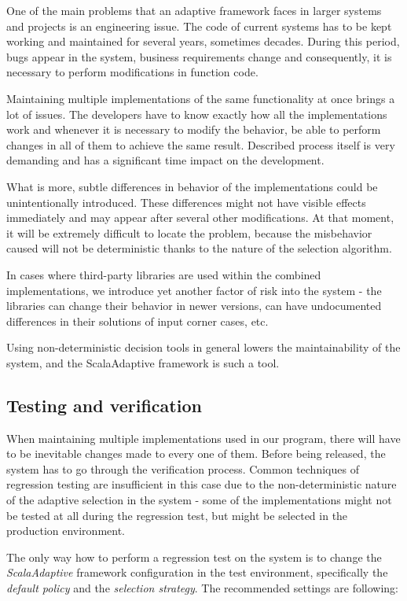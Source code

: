 One of the main problems that an adaptive framework faces in larger systems and projects is an engineering issue. The code of current systems has to be kept working and maintained for several years, sometimes decades. During this period, bugs appear in the system, business requirements change and consequently, it is necessary to perform modifications in function code.

Maintaining multiple implementations of the same functionality at once brings a lot of issues. The developers have to know exactly how all the implementations work and whenever it is necessary to modify the behavior, be able to perform changes in all of them to achieve the same result. Described process itself is very demanding and has a significant time impact on the development. 

What is more, subtle differences in behavior of the implementations could be unintentionally introduced. These differences might not have visible effects immediately and may appear after several other modifications. At that moment, it will be extremely difficult to locate the problem, because the misbehavior caused will not be deterministic thanks to the nature of the selection algorithm.

In cases where third-party libraries are used within the combined implementations, we introduce yet another factor of risk into the system - the libraries can change their behavior in newer versions, can have undocumented differences in their solutions of input corner cases, etc. 

Using non-deterministic decision tools in general lowers the maintainability of the system, and the ScalaAdaptive framework is such a tool.

\subsection{Testing and verification}

When maintaining multiple implementations used in our program, there will have to be inevitable changes made to every one of them. Before being released, the system has to go through the verification process. Common techniques of regression testing are insufficient in this case due to the non-deterministic nature of the adaptive selection in the system - some of the implementations might not be tested at all during the regression test, but might be selected in the production environment.

The only way how to perform a regression test on the system is to change the \textit{ScalaAdaptive} framework configuration in the test environment, specifically the \textit{default policy} and the \textit{selection strategy}. The recommended settings are following:

